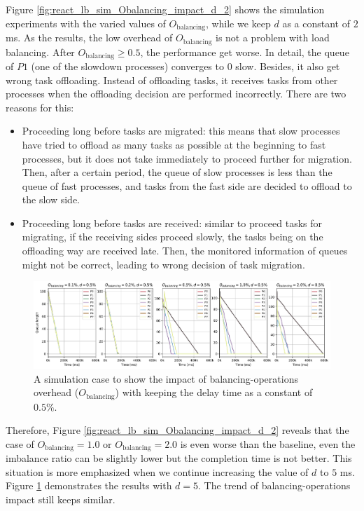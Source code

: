 Figure \ref{fig:react_lb_sim_Obalancing_impact_d_2} shows the simulation experiments with the varied values of $O_{\text{balancing}}$, while we keep $d$ as a constant of $2$ ms. As the results, the low overhead of $O_{\text{balancing}}$ is not a problem with load balancing. After $O_{\text{balancing}} \geq 0.5$, the performance get worse. In detail, the queue of $P1$ (one of the slowdown processes) converges to $0$ slow. Besides, it also get wrong task offloading. Instead of offloading tasks, it receives tasks from other processes when the offloading decision are performed incorrectly. There are two reasons for this:
\begin{itemize}
	\item Proceeding long before tasks are migrated: this means that slow processes have tried to offload as many tasks as possible at the beginning to fast processes, but it does not take immediately to proceed further for migration. Then, after a certain period, the queue of slow processes is less than the queue of fast processes, and tasks from the fast side are decided to offload to the slow side.
	\item Proceeding long before tasks are received: similar to proceed tasks for migrating, if the receiving sides proceed slowly, the tasks being on the offloading way are received late. Then, the monitored information of queues might not be correct, leading to wrong decision of task migration.
\end{itemize}

\begin{figure}[t]
  \centering
  \includegraphics[scale=0.45]{./pictures/perf_analysis_model/perf_model_queue_decrease_blancing_impact_d5.pdf}
	\caption{A simulation case to show the impact of balancing-operations overhead ($O_{\text{balancing}}$) with keeping the delay time as a constant of $0.5\%$.}
	\label{fig:react_lb_sim_Obalancing_impact_d_5}
\end{figure}

Therefore, Figure \ref{fig:react_lb_sim_Obalancing_impact_d_2} reveals that the case of $O_{\text{balancing}} = 1.0$ or $O_{\text{balancing}} = 2.0$ is even worse than the baseline, even the imbalance ratio can be slightly lower but the completion time is not better. This situation is more emphasized when we continue increasing the value of $d$ to $5$ ms. Figure \ref{fig:react_lb_sim_Obalancing_impact_d_5} demonstrates the results with $d = 5$. The trend of balancing-operations impact still keeps similar.\\

